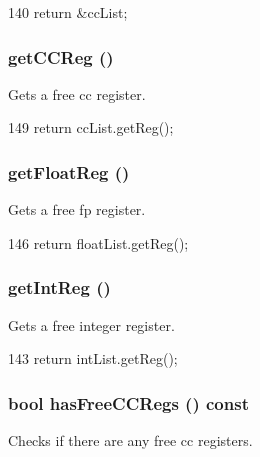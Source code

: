 \begin{DoxyCode}
140 { return &ccList; }
\end{DoxyCode}
\hypertarget{classUnifiedFreeList_ab34cd45ad8654ba4843984b09b7c0465}{
\subsubsection[{getCCReg}]{ getCCReg ()}}
\label{classUnifiedFreeList_ab34cd45ad8654ba4843984b09b7c0465}
Gets a free cc register. 


\begin{DoxyCode}
149 { return ccList.getReg(); }
\end{DoxyCode}
\hypertarget{classUnifiedFreeList_a64f4baa8fe451eb2e016cb2115f18ce6}{
\subsubsection[{getFloatReg}]{ getFloatReg ()}}
\label{classUnifiedFreeList_a64f4baa8fe451eb2e016cb2115f18ce6}
Gets a free fp register. 


\begin{DoxyCode}
146 { return floatList.getReg(); }
\end{DoxyCode}
\hypertarget{classUnifiedFreeList_a716ff37969684e89443b573f87ed235a}{
\subsubsection[{getIntReg}]{ getIntReg ()}}
\label{classUnifiedFreeList_a716ff37969684e89443b573f87ed235a}
Gets a free integer register. 


\begin{DoxyCode}
143 { return intList.getReg(); }
\end{DoxyCode}
\hypertarget{classUnifiedFreeList_a03260b1c6071ae0e6424a15195d322b1}{
\subsubsection[{hasFreeCCRegs}]{\setlength{\rightskip}{0pt plus 5cm}bool hasFreeCCRegs () const}}
\label{classUnifiedFreeList_a03260b1c6071ae0e6424a15195d322b1}
Checks if there are any free cc registers. 



